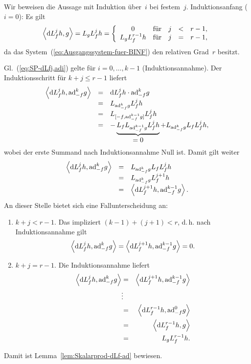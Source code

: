 \begin{svmultproof2}
Wir beweisen die Aussage mit Induktion über~$i$ bei festem~$j$.
Induktionsanfang ($i=0$): Es gilt 
\[
\left\langle {\mathrm{d}} L_{f}^{j}h,g\right\rangle =L_{g}L_{f}^{j}h=\left\{ \begin{array}{ccccc}
0 & \mbox{für} & j & < & r-1,\\
L_{g}L_{f}^{r-1}h & \mbox{für} & j & = & r-1,
\end{array}\right.
\]
da das System~(\ref{eq:Ausgangssystem-fuer-BINF}) den relativen
Grad~$r$ besitzt. 

Gl.~(\ref{eq:SP-dLfj,adi}) gelte für $i=0,\ldots,k-1$ (Induktionsannahme).
Der Induktionsschritt für $k+j\leq r-1$ liefert
\[
\begin{array}{ccl}
\left\langle {\mathrm{d}} L_{f}^{j}h,{\operatorname{ad}}_{-f}^{k}g\right\rangle  & = & {\mathrm{d}} L_{f}^{j}h\cdot{\operatorname{ad}}_{-f}^{k}g\\
 & = & L_{{\operatorname{ad}}_{-f}^{k}g}L_{f}^{j}h\\
 & = & L_{[-f,{\operatorname{ad}}_{-f}^{k-1}g]}L_{f}^{j}h\\
 & = & -\underbrace{L_{f}L_{{\operatorname{ad}}_{-f}^{k-1}g}L_{f}^{j}h}_{{\displaystyle =0}}+L_{{\operatorname{ad}}_{-f}^{k}g}L_{f}L_{f}^{j}h,
\end{array}
\]
wobei der erste Summand nach Induktionsannahme Null ist. Damit gilt
weiter 
\[
\begin{array}{lcl}
\left\langle {\mathrm{d}} L_{f}^{j}h,{\operatorname{ad}}_{-f}^{k}g\right\rangle  & = & L_{{\operatorname{ad}}_{-f}^{k}g}L_{f}L_{f}^{j}h\\
 & = & L_{{\operatorname{ad}}_{-f}^{k}g}L_{f}^{j+1}h\\
 & = & \left\langle {\mathrm{d}} L_{f}^{j+1}h,{\operatorname{ad}}_{-f}^{k-1}g\right\rangle .
\end{array}
\]
An dieser Stelle bietet sich eine Fallunterscheidung an:

\begin{enumerate}
\item $k+j<r-1$. Das impliziert $(k-1)+(j+1)<r$, d.\,h. nach Induktionsannahme
gilt 
\[
\left\langle {\mathrm{d}} L_{f}^{j}h,{\operatorname{ad}}_{-f}^{k}g\right\rangle =\left\langle {\mathrm{d}} L_{f}^{j+1}h,{\operatorname{ad}}_{-f}^{k-1}g\right\rangle =0.
\]
\item $k+j=r-1$. Die Induktionsannahme liefert 
\begin{eqnarray*}
\left\langle {\mathrm{d}} L_{f}^{j}h,{\operatorname{ad}}_{-f}^{k}g\right\rangle  & = & \left\langle {\mathrm{d}} L_{f}^{j+1}h,{\operatorname{ad}}_{-f}^{k-1}g\right\rangle \\
 & \vdots\\
 & = & \left\langle {\mathrm{d}} L_{f}^{r-1}h,{\operatorname{ad}}_{-f}^{0}g\right\rangle \\
 & = & \left\langle {\mathrm{d}} L_{f}^{r-1}h,g\right\rangle \\
 & = & L_{g}L_{f}^{r-1}h.
\end{eqnarray*}
\end{enumerate}
Damit ist Lemma~\ref{lem:Skalarprod-dLf-ad} bewiesen.
\end{svmultproof2}

